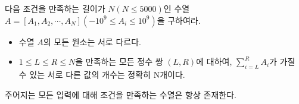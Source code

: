 다음 조건을 만족하는 길이가 $N(N \le 5000)$인 수열 $A = [A_1, A_2, \cdots, A_N](-10^{9} \le A_i \le 10^{9})$을 구하여라.

\begin{itemize}
    \item 수열 $A$의 모든 원소는 서로 다르다.
    \item $1 \le L \le R \le N$을 만족하는 모든 정수 쌍 $(L, R)$에 대하여, $\sum_{i=L}^R A_i$가 가질 수 있는 서로 다른 값의 개수는 정확히 N개이다.
\end{itemize}

주어지는 모든 입력에 대해 조건을 만족하는 수열은 항상 존재한다.